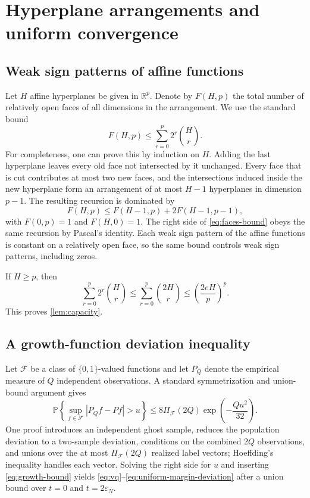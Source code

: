 \documentclass[11pt]{article}
\newcommand{\Pp}{\mathbb P}
\newcommand{\R}{\mathbb R}
\newcommand{\calF}{\mathcal F}
\newcommand{\eps}{\varepsilon}
\begin{document}
\section{Hyperplane arrangements and uniform convergence}
\label{app:capacity}

\subsection{Weak sign patterns of affine functions}

Let $H$ affine hyperplanes be given in $\R^p$.  Denote by $F(H,p)$ the total number of relatively open faces of all dimensions in the arrangement.  We use the standard bound
\begin{equation}
\label{eq:faces-bound}
F(H,p)
\le
\sum_{r=0}^{p}2^r\binom Hr.
\end{equation}
For completeness, one can prove this by induction on $H$.  Adding the last hyperplane leaves every old face not intersected by it unchanged.  Every face that is cut contributes at most two new faces, and the intersections induced inside the new hyperplane form an arrangement of at most $H-1$ hyperplanes in dimension $p-1$.  The resulting recursion is dominated by
\[
F(H,p)\le F(H-1,p)+2F(H-1,p-1),
\]
with $F(0,p)=1$ and $F(H,0)=1$.  The right side of \eqref{eq:faces-bound} obeys the same recursion by Pascal's identity.  Each weak sign pattern of the affine functions is constant on a relatively open face, so the same bound controls weak sign patterns, including zeros.

If $H\ge p$, then
\[
\sum_{r=0}^{p}2^r\binom Hr
\le
\sum_{r=0}^{p}\binom{2H}{r}
\le
\left(\frac{2eH}{p}\right)^p.
\]
This proves \cref{lem:capacity}.

\subsection{A growth-function deviation inequality}

Let $\calF$ be a class of $\{0,1\}$-valued functions and let $P_Q$ denote the empirical measure of $Q$ independent observations.  A standard symmetrization and union-bound argument gives
\begin{equation}
\label{eq:vc-ineq}
\Pp\left
\{
\sup_{f\in\calF}|P_Qf-Pf|>u
\right\}
\le
8\Pi_{\calF}(2Q)\exp\left(-\frac{Qu^2}{32}\right).
\end{equation}
One proof introduces an independent ghost sample, reduces the population deviation to a two-sample deviation, conditions on the combined $2Q$ observations, and unions over the at most $\Pi_{\calF}(2Q)$ realized label vectors; Hoeffding's inequality handles each vector.  Solving the right side for $u$ and inserting \eqref{eq:growth-bound} yields \eqref{eq:vq}--\eqref{eq:uniform-margin-deviation} after a union bound over $t=0$ and $t=2\eps_N$.
\end{document}
